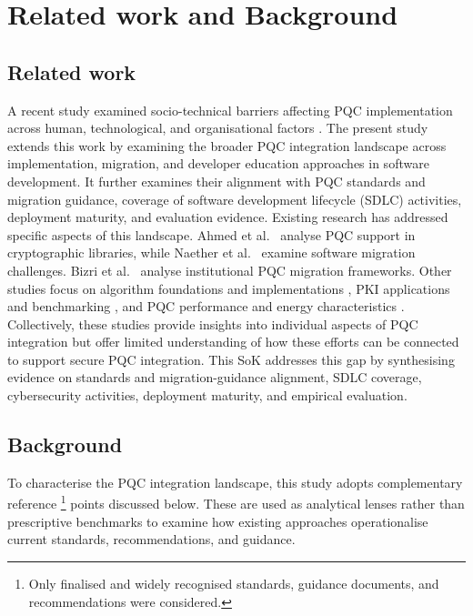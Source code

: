 \documentclass[letterpaper,twocolumn,10pt]{article}
\begin{document}
\section{Related work and Background}
\label{RWBack}

\subsection{Related work}
\label{RW}

A recent study examined socio-technical barriers affecting PQC implementation across human, technological, and organisational factors \cite{anonymous_pqc_sok_2026}. The present study extends this work by examining the broader PQC integration landscape across implementation, migration, and developer education approaches in software development. It further examines their alignment with PQC standards and migration guidance, coverage of software development lifecycle (SDLC) activities, deployment maturity, and evaluation evidence. Existing research has addressed specific aspects of this landscape. Ahmed et al.~\cite{ahmed_survey_2025} analyse PQC support in cryptographic libraries, while Naether et al.~\cite{naether_migrating_2024} examine software migration challenges. Bizri et al.~\cite{migration_Comparison} analyse institutional PQC migration frameworks. Other studies focus on algorithm foundations and implementations \cite{NISTTheoryReview}, PKI applications and benchmarking \cite{cryptography10010011}, and PQC performance and energy characteristics \cite{cryptography9020032, BenchAlgo}. Collectively, these studies provide insights into individual aspects of PQC integration but offer limited understanding of how these efforts can be connected to support secure PQC integration. This SoK addresses this gap by synthesising evidence on standards and migration-guidance alignment, SDLC coverage, cybersecurity activities, deployment maturity, and empirical evaluation.

\subsection{Background}
\label{Back}

To characterise the PQC integration landscape, this study adopts complementary reference \footnote{Only finalised and widely recognised standards, guidance documents, and recommendations were considered.} points discussed below. These are used as analytical lenses rather than prescriptive benchmarks to examine how existing approaches operationalise current standards, recommendations, and guidance.
\end{document}
